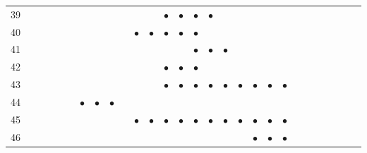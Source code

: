 \documentclass[text.tex]{subfiles}
\begin{document}
\begin{table}
{\begin{tabular}{l|ccccccccccccccccccccccccccc}
39  &           &           &           &           &           &           &           &           &           &           &           & $\bullet$ & $\bullet$ & $\bullet$ & $\bullet$ &           &           &           &           &           &           &           &           &           &           &           &           \\
40  &           &           &           &           &           &           &           &           &           & $\bullet$ & $\bullet$ & $\bullet$ & $\bullet$ & $\bullet$ &           &           &           &           &           &           &           &           &           &           &           &           &           \\
41  &           &           &           &           &           &           &           &           &           &           &           &           &           & $\bullet$ & $\bullet$ & $\bullet$ &           &           &           &           &           &           &           &           &           &           &           \\
42  &           &           &           &           &           &           &           &           &           &           &           & $\bullet$ & $\bullet$ & $\bullet$ &           &           &           &           &           &           &           &           &           &           &           &           &           \\ 
43  &           &           &           &           &           &           &           &           &           &           &           & $\bullet$ & $\bullet$ & $\bullet$ & $\bullet$ & $\bullet$ & $\bullet$ & $\bullet$ & $\bullet$ & $\bullet$ &           &           &           &           &           &           &           \\
44  &           &           &           &           &           & $\bullet$ & $\bullet$ & $\bullet$ &           &           &           &           &           &           &           &           &           &           &           &           &           &           &           &           &           &           &           \\
45  &           &           &           &           &           &           &           &           &           & $\bullet$ & $\bullet$ & $\bullet$ & $\bullet$ & $\bullet$ & $\bullet$ & $\bullet$ & $\bullet$ & $\bullet$ & $\bullet$ & $\bullet$ &           &           &           &           &           &           &           \\
46  &           &           &           &           &           &           &           &           &           &           &           &           &           &           &           &           &           & $\bullet$ & $\bullet$ & $\bullet$ &           &           &           &           &           &           &           \\ 

\end{tabular}}
\end{table}
\end{document}
